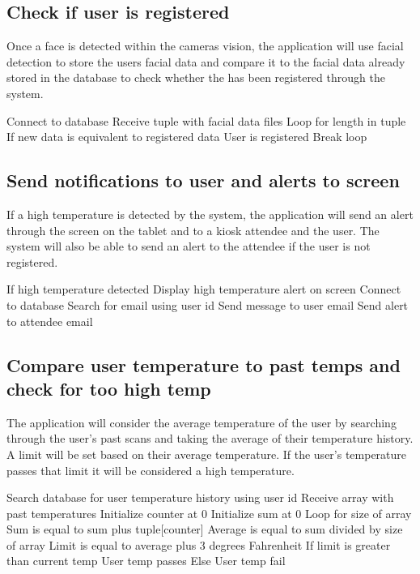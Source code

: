 \documentclass[12pt, letterpaper]{article}
\begin{document}
    \subsection{Check if user is registered}
    Once a face is detected within the cameras vision, the application will use facial detection to 
    store the users facial data and compare it to the facial data already stored in the database to 
    check whether the has been registered through the system.
    \begin{algorithm}[caption={Facial info search.}, label={alg1}]
        Connect to database
        Receive tuple with facial data files
        Loop for length in tuple
            If new data is equivalent to registered data
                User is registered
                Break loop
    \end{algorithm}
    \subsection{Send notifications to user and alerts to screen}
    If a high temperature is detected by the system, the application will send an alert through the 
    screen on the tablet and to a kiosk attendee and the user. The system will also be able to send an 
    alert to the attendee if the user is not registered.
    \begin{algorithm}[caption={Temperature notification}, label={alg1}]
        If high temperature detected
            Display high temperature alert on screen
            Connect to database
            Search for email using user id
            Send message to user email
            Send alert to attendee email
    \end{algorithm}
    \subsection{Compare user temperature to past temps and check for too high temp}
    The application will consider the average temperature of the user by searching through the user’s 
    past scans and taking the average of their temperature history. A limit will be set based on their 
    average temperature. If the user’s temperature passes that limit it will be considered a high 
    temperature.
    \begin{algorithm}[caption={Check user temperature}, label={alg1}]
        Search database for user temperature history using user id
        Receive array with past temperatures
        Initialize counter at 0
        Initialize sum at 0
        Loop for size of array
            Sum is equal to sum plus tuple[counter]
            Average is equal to sum divided by size of array
            Limit is equal to average plus 3 degrees Fahrenheit
            If limit is greater than current temp
                User temp passes
            Else
                User temp fail
    \end{algorithm}
\end{document}
